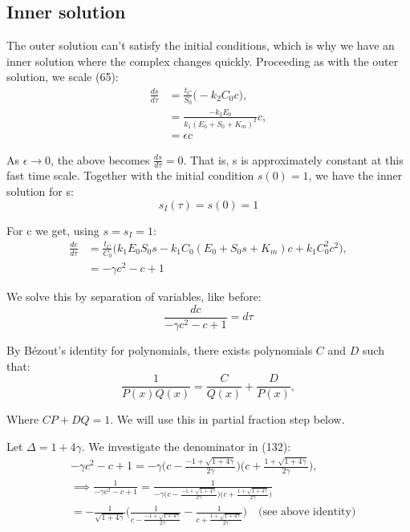 \documentclass[12pt]{article}
\begin{document}
\subsection{Inner solution}

The outer solution can't satisfy the initial conditions, which is why
we have an inner solution where the complex changes
quickly. Proceeding as with the outer solution, we scale (65):
\begin{align}
\frac{ds}{d\tau} &= \frac{t_C}{S_0} \Big( - k_2 C_0 c \Big), \\
                 &= \frac{-k_2 E_0}{k_1(E_0 + S_0 + K_m)^2} c, \\
                 &= \epsilon c
\end{align}

As $\epsilon \to 0$, the above becomes $\frac{ds}{d\tau} = 0$. That
is, s is approximately constant at this fast time scale. Together with
the initial condition $s(0)=1$, we have the inner solution for s:
\begin{equation}
s_I(\tau) = s(0) = 1
\end{equation}

For c we get, using $s= s_I = 1$:
\begin{align}
\frac{dc}{d\tau} &= \frac{t_C}{C_0} \Big(
                     k_1 E_0 S_0 s - k_1 C_0 (E_0 + S_0 s + K_m) c + k_1 C_0^2 c^2
                     \Big), \\
                 & = - \gamma c^2 - c + 1
\end{align}

We solve this by separation of variables, like before:
\begin{equation}
\frac{dc}{- \gamma c^2 - c + 1} = d\tau
\end{equation}

By B\'{e}zout's identity for polynomials, there exists polynomials $C$
and $D$ such that:
\begin{equation}
\frac{1}{P(x) Q(x)} = \frac{C}{Q(x)} + \frac{D}{P(x)},
\end{equation}

Where $CP+DQ = 1$. We will use this in partial fraction step below.

Let $\Delta=1 + 4\gamma$. We investigate the denominator in (132):
\begin{align}
&-\gamma c^2 - c + 1 = - \gamma
                        \Big(c - \frac{-1 + \sqrt{1+4 \gamma}}{2 \gamma}\Big)
                        \Big(c + \frac{ 1 + \sqrt{1+4 \gamma}}{2 \gamma}\Big), \\
&\implies \frac{1}{- \gamma c^2 - c + 1} = \frac{1}
                        {- \gamma
                        \Big(c - \frac{-1 + \sqrt{1+4 \gamma}}{2 \gamma}\Big)
                        \Big(c + \frac{ 1 + \sqrt{1+4 \gamma}}{2 \gamma}\Big)} \\
&= - \frac{1}{\sqrt{1+4\gamma}}
   \Bigg(\frac{1}{c - \frac{-1 + \sqrt{1+4 \gamma}}{2 \gamma}} -
        \frac{1}{c + \frac{1 + \sqrt{1+4 \gamma}}{2 \gamma}} \Bigg)
   \quad \text{(see above identity)}
\end{align}
\end{document}
